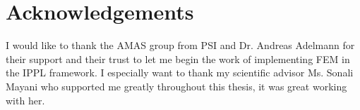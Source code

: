 \section*{Acknowledgements}

I would like to thank the AMAS group from PSI and Dr. Andreas Adelmann for their support
and their trust to let me begin the work of implementing FEM in the IPPL framework.
I especially want to thank my scientific advisor Ms. Sonali Mayani who supported me greatly
throughout this thesis, it was great working with her.
